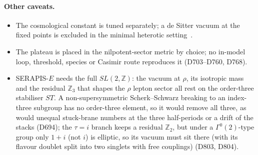 \documentclass[aps,prd,twocolumn,superscriptaddress,nofootinbib,floatfix]{revtex4-2}
\begin{document}
\paragraph{Other caveats.}
\begin{itemize}
\item The cosmological constant is tuned separately; a de Sitter vacuum at the fixed points is excluded in the minimal heterotic setting~\cite{arXiv_2212_03876}.
\item The plateau is placed in the nilpotent-sector metric by choice; no in-model loop, threshold, species or Casimir route reproduces it (D703--D760, D768).
\item SERAPIS-$E$ needs the full $SL(2,\mathbb{Z})$: the vacuum at $\rho$, its isotropic mass and the residual $\mathbb{Z}_3$ that shapes the $\rho$ lepton sector all rest on the order-three stabiliser $ST$. A non-supersymmetric Scherk--Schwarz breaking to an index-three subgroup has no order-three element, so it would remove all three, as would unequal stuck-brane numbers at the three half-periods or a drift of the stacks (D694); the $\tau=i$ branch keeps a residual $\mathbb{Z}_2$, but under a $\Gamma^0(2)$-type group only $1+i$ (not $i$) is elliptic, so its vacuum must sit there (with its flavour doublet split into two singlets with free couplings) (D803, D804).

\end{itemize}
\end{document}
